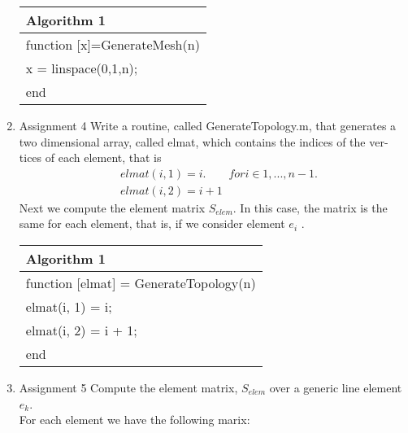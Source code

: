\documentclass[a4paper,10pt]{report}
\begin{document}
\begin{enumerate}
\begin{table}[!h]\centering

\begin{tabular}{ |l| } 
\hline
\textbf{Algorithm 1}\\
\hline
\hspace{0.5cm}function [x]=GenerateMesh(n)\\
\hspace{1cm}x = linspace(0,1,n);\\
\hspace{0.5cm}end\\
\hline
\end{tabular}
\end{table}

\item{Assignment 4} Write a routine, called GenerateTopology.m, that generates
a two dimensional array, called elmat, which contains the indices of the ver-
tices of each element, that is
\begin{align*}
&elmat(i, 1) = i. \qquad for i ∈ {1, . . . , n − 1}.\\
&elmat(i, 2) = i + 1
\end{align*}
Next we compute the element matrix $S_{elem}$. In this case, the matrix is the
same for each element, that is, if we consider element $e_i$ .
\begin{table}[!h]\centering

\begin{tabular}{ |l| } 
\hline
\textbf{Algorithm 1}\\
\hline
\hspace{0.5cm}function [elmat] = GenerateTopology(n)\\
\hspace{1cm}elmat(i, 1) = i;\\
\hspace{1cm}elmat(i, 2) = i + 1;\\
\hspace{0.5cm}end\\
\hline
\end{tabular}
\end{table}

\item{Assignment 5} Compute the element matrix, $S_{elem}$ over a generic line element $e_k$.\\
For each element we have the following marix:


\end{enumerate}
\end{document}
